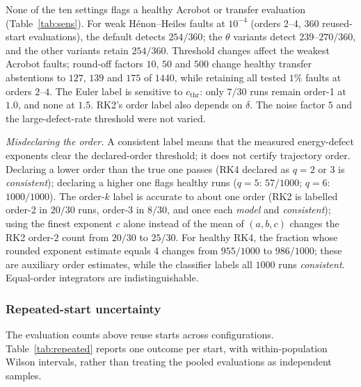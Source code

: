 \documentclass[10pt]{article}
\theoremstyle{definition}
\newcommand{\fittable}[2][\linewidth]{%
  \sbox{\tablebox}{#2}%
  \ifdim\wd\tablebox>#1\relax
    \resizebox{#1}{!}{\usebox{\tablebox}}%
  \else
    \usebox{\tablebox}%
  \fi}
\begin{document}
None of the ten settings flags a healthy Acrobot or
transfer evaluation (Table~\ref{tab:sens}). For weak H\'enon--Heiles faults at $10^{-4}$ (orders 2--4, $360$
reused-start evaluations), the default detects $254/360$; the $\theta$
variants detect $239$--$270/360$, and the other variants retain $254/360$.
Threshold changes affect the weakest
Acrobot faults; round-off factors $10$, $50$ and $500$ change healthy transfer
abstentions to $127$, $139$ and $175$ of $1440$, while retaining all tested
$1\%$ faults at orders $2$--$4$. The Euler label is sensitive to
$c_{\mathrm{thr}}$: only $7/30$ runs remain order-1 at $1.0$, and none at
$1.5$. RK2's order label also depends on $\delta$. The noise factor $5$ and
the large-defect-rate threshold were not varied.

\emph{Misdeclaring the order.} A consistent label means that the measured
energy-defect exponents clear the declared-order threshold; it does not
certify trajectory order.
Declaring a lower order than the true one passes (RK4 declared as $q=2$ or $3$ is
\emph{consistent}); declaring a higher one flags healthy runs ($q=5$: $57/1000$;
$q=6$: $1000/1000$). The order-$k$ label is accurate to about one order (RK2 is
labelled order-2 in $20/30$ runs, order-3 in $8/30$, and once each \emph{model} and
\emph{consistent}); using the finest exponent $c$ alone instead of the mean of
$(a,b,c)$ changes the RK2 order-2 count from $20/30$ to $25/30$.
For healthy RK4, the fraction whose rounded exponent estimate equals 4 changes
from $955/1000$ to $986/1000$; these are auxiliary order estimates, while
the classifier labels all $1000$ runs \emph{consistent}. Equal-order integrators are indistinguishable.

\subsubsection{Repeated-start uncertainty}\label{sec:exp:summary}

The evaluation counts above reuse starts across configurations. Table~\ref{tab:repeated}
reports one outcome per start, with within-population Wilson intervals,
rather than treating the pooled evaluations as independent samples.

\begin{table}[htbp]
\centering\small
\fittable{}
\caption{One binary endpoint per start across its configuration grid.
``Any healthy fault flag'' includes model and order-$k$ labels but excludes
abstentions. ``All model'' requires the $1\%$ fault to be labelled model in
every order-$2$--$4$, step-size configuration. Each population has $40$
independently sampled starts; intervals concern new starts in that population,
not new systems.}
\label{tab:repeated}
\end{table}
\end{document}
